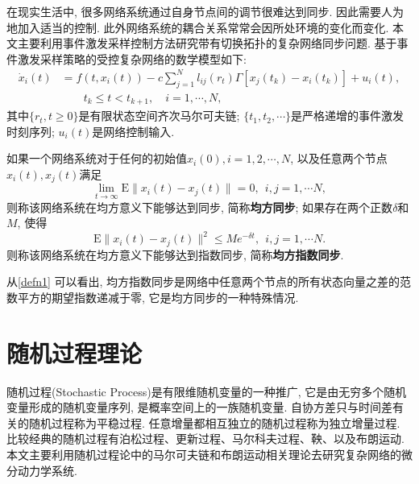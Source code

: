         在现实生活中, 很多网络系统通过自身节点间的调节很难达到同步. 因此需要人为地加入适当的控制. 此外网络系统的耦合关系常常会因所处环境的变化而变化. 本文主要利用事件激发采样控制方法研究带有切换拓扑的复杂网络同步问题. 基于事件激发采样策略的受控复杂网络的数学模型如下:
        \begin{align}\label{eventcontrolnetwork}
           \nonumber \dot{x}_{i}(t)&=f(t,x_{i}(t))-c\sum^N_{j=1}l_{ij}(r_{t})\Gamma[x_{j}(t_k)-x_{i}(t_{k})]+u_i(t),\\
            &\quad\quad t_{k}\leq t< t_{k+1}, \quad i = 1,\cdots,N,
        \end{align}
        其中$\{r_{t},t\geq 0\}$是有限状态空间齐次马尔可夫链; $\{t_{1},t_{2},\cdots \}$是严格递增的事件激发时刻序列; $u_i(t)$是网络控制输入.
        \begin{defn}\label{defn1}%
            如果一个网络系统对于任何的初始值$x_i(0), i=1,2,\cdots,N$, 以及任意两个节点$x_i(t),x_j(t)$满足\
                $$ \lim_{t\rightarrow\infty}\mathrm{E}\|x_i(t)-x_j(t)\|=0, ~~i,j=1,\cdots N,$$
            则称该网络系统在均方意义下能够达到同步, 简称\textbf{均方同步};
            如果存在两个正数$\delta$和$M$, 使得
            $$\mathrm{E}\|x_i(t)-x_j(t)\|^2\leq Me^{-\delta t}, ~~i,j=1,\cdots N.$$
            则称该网络系统在均方意义下能够达到指数同步, 简称\textbf{均方指数同步}.
        \end{defn}
    \begin{rem}
    从\autoref{defn1} 可以看出, 均方指数同步是网络中任意两个节点的所有状态向量之差的范数平方的期望指数递减于零, 它是均方同步的一种特殊情况.
    \end{rem}
\section{随机过程理论}
    随机过程(Stochastic Process)是有限维随机变量的一种推广, 它是由无穷多个随机变量形成的随机变量序列, 是概率空间上的一族随机变量. 自协方差只与时间差有关的随机过程称为平稳过程. 任意增量都相互独立的随机过程称为独立增量过程. 比较经典的随机过程有泊松过程、更新过程、马尔科夫过程、鞅、以及布朗运动. 本文主要利用随机过程论中的马尔可夫链和布朗运动相关理论去研究复杂网络的微分动力学系统.

